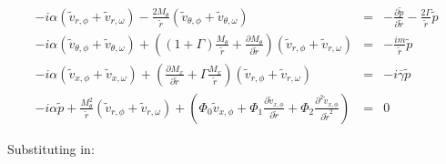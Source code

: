 \begin{eqnarray}
-i \alpha 
\left(
\widetilde{v}_{r,\phi} 
+\widetilde{v}_{r,\omega} 
\right)
-\frac{2 M_{\theta}}{\widetilde{r}} 
\left(
\widetilde{v}_{\theta,\phi} 
+\widetilde{v}_{\theta,\omega} 
\right)
&=&
-
\frac{\partial \widetilde{p} }{\partial \widetilde{r}} 
-
\frac{2 \Gamma}{\widetilde{r}} \widetilde{p}
\nonumber
\\
-i
\alpha
\left(
\widetilde{v}_{\theta,\phi} 
+\widetilde{v}_{\theta,\omega} 
\right)
+
\left(
\left(1 + \Gamma \right)
\frac{M_{\theta} }{\widetilde{r}}
+
\frac{\partial M_{\theta} }{\partial \widetilde{r}}
\right) 
\left(
\widetilde{v}_{r,\phi} 
+\widetilde{v}_{r,\omega} 
\right)
&=&
-\frac{i m }{\widetilde{r} } \widetilde{p}
\nonumber
\\
-i
\alpha
\left(
\widetilde{v}_{x,\phi} 
+\widetilde{v}_{x,\omega} 
\right)
+
\left(
\frac{\partial M_x }{\partial \widetilde{r}} 
+
\Gamma \frac{M_x }{\widetilde{r}}
\right)
\left(
\widetilde{v}_{r,\phi} 
+\widetilde{v}_{r,\omega} 
\right)
&=&
-i \overline{\gamma} \widetilde{p}
\nonumber
\\
-i
\alpha
 \widetilde{p}
+
\frac{M_{\theta}^2}{\widetilde{r}}
\left(
\widetilde{v}_{r,\phi} 
+\widetilde{v}_{r,\omega} 
\right)
+ 
\left(
\Phi_0 
\widetilde{v}_{x,\phi}
+\Phi_1 
\frac{\partial
\widetilde{v}_{x,\phi}
}{\partial \widetilde{r}} 
+\Phi_2 
\frac{\partial^2
\widetilde{v}_{x,\phi}
}{\partial \widetilde{r}^2} 
\right)
&=&
0
\nonumber
\end{eqnarray}

Substituting in:

